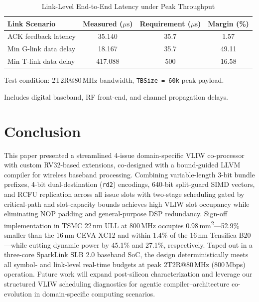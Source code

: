 \documentclass[9pt,conference]{IEEEtran}
\begin{document}
\begin{table}[t]
    \centering
    \caption{Link-Level End-to-End Latency under Peak Throughput}
    \label{tab:link_latency}
    \begin{threeparttable}
    \renewcommand{\arraystretch}{1.16}
    \footnotesize
    \setlength{\tabcolsep}{3.5pt}
    \begin{tabular}{@{}>{\raggedright\arraybackslash}p{2.45cm}ccc@{}}
        \toprule
        \textbf{Link Scenario} & \textbf{Measured ($\mu\mathrm{s}$)} & \textbf{Requirement ($\mu\mathrm{s}$)} & \textbf{Margin (\%)} \\
        \midrule
        ACK feedback latency & 35.140 & 35.7 & 1.57 \\
        Min G-link data delay & 18.167 & 35.7 & 49.11 \\
        Min T-link data delay & 417.088 & 500 & 16.58 \\
        \bottomrule
    \end{tabular}
    \begin{tablenotes}[flushleft]
        \scriptsize
        \item Test condition: 2T2R@80\,MHz bandwidth, \texttt{TBSize = 60k} peak payload.
        \item Includes digital baseband, RF front-end, and channel propagation delays.
    \end{tablenotes}
    \end{threeparttable}
\end{table}

\section{Conclusion}

This paper presented a streamlined 4-issue domain-specific VLIW co-processor with custom RV32-based extensions, co-designed with a bound-guided LLVM compiler for wireless baseband processing. Combining variable-length 3-bit bundle prefixes, 4-bit dual-destination (\texttt{rd2}) encodings, 640-bit split-guard SIMD vectors, and RCFU replication across all issue slots with two-stage scheduling gated by critical-path and slot-capacity bounds achieves high VLIW slot occupancy while eliminating NOP padding and general-purpose DSP redundancy. Sign-off implementation in TSMC 22\,nm ULL at 800\,MHz occupies 0.98\,mm\textsuperscript{2}---52.9\% smaller than the 16\,nm CEVA XC12 and within 1.4\% of the 16\,nm Tensilica B20---while cutting dynamic power by 45.1\% and 27.1\%, respectively. Taped out in a three-core SparkLink SLB 2.0 baseband SoC, the design deterministically meets all symbol- and link-level real-time budgets at peak 2T2R@80\,MHz (800\,Mbps) operation. Future work will expand post-silicon characterization and leverage our structured VLIW scheduling diagnostics for agentic compiler--architecture co-evolution in domain-specific computing scenarios.

\clearpage
{}


\end{document}
